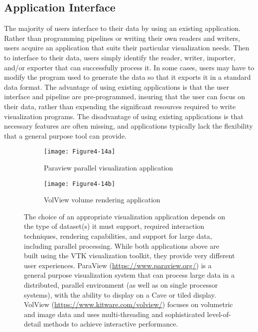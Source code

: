 \subsection{Application Interface}
\label{subsec:application_interface}

The majority of users interface to their data by using an existing application. Rather than programming pipelines or writing their own readers and writers, users acquire an application that suits their particular visualization needs. Then to interface to their data, users simply identify the reader, writer, importer, and/or exporter that can successfully process it. In some cases, users may have to modify the program used to generate the data so that it exports it in a standard data format. The advantage of using existing applications is that the user interface and pipeline are pre-programmed, insuring that the user can focus on their data, rather than expending the significant resources required to write visualization programs. The disadvantage of using existing applications is that necessary features are often missing, and applications typically lack the flexibility that a general purpose tool can provide.

\begin{figure}[htb]
  \begin{subfigure}[h]{0.48\linewidth}
    \texttt{[image: Figure4-14a]}
    \caption{Paraview parallel visualization application}
    \label{fig:Figure4-14a}
  \end{subfigure}
  \hfill
  \begin{subfigure}[h]{0.48\linewidth}
    \texttt{[image: Figure4-14b]}
    \caption*{VolView volume rendering application}
    \label{fig:Figure4-14b}
  \end{subfigure}
  \caption{The choice of an appropriate visualization application depends on the type of dataset(s) it must support, required interaction techniques, rendering capabilities, and support for large data, including parallel processing. While both applications above are built using the VTK visualization toolkit, they provide very different user experiences. ParaView (\href{https://www.paraview.org/}{https://www.paraview.org/}) is a general purpose visualization system that can process large data in a distributed, parallel environment (as well as on single processor systems), with the ability to display on a Cave or tiled display. VolView (\href{https://www.kitware.com/volview/}{https://www.kitware.com/volview/}) focuses on volumetric and image data and uses multi-threading and sophisticated level-of-detail methods to achieve interactive performance.}\label{fig:Figure4-14}
\end{figure}

